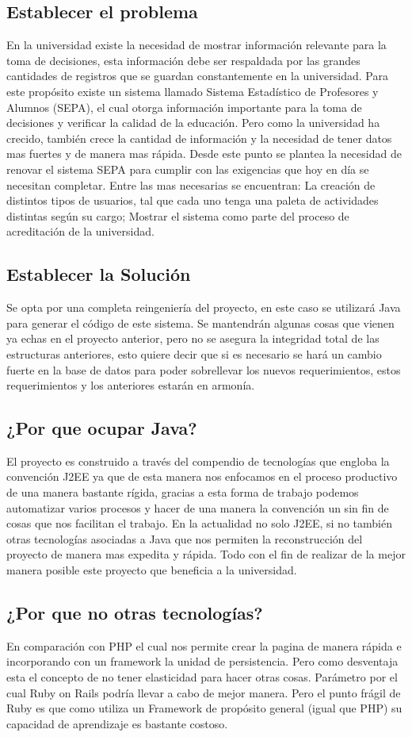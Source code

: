 \documentclass[a4paper,12pt,openany,oneside]{book}
\begin{document}
\subsection{Establecer el problema}
En la universidad existe la necesidad de mostrar información relevante para la toma de decisiones, esta información debe ser respaldada por las grandes cantidades de registros que se guardan constantemente en la universidad. Para este propósito existe un sistema llamado Sistema Estadístico de Profesores y Alumnos (SEPA), el cual otorga información importante para la toma de decisiones y verificar la calidad de la educación. Pero como la universidad ha crecido, también crece la cantidad de información y la necesidad de tener datos mas fuertes y de manera mas rápida. Desde este punto se plantea la necesidad de renovar el sistema SEPA para cumplir con las exigencias que hoy en día se necesitan completar. Entre las mas necesarias se encuentran: La creación de distintos tipos de usuarios, tal que cada uno tenga una paleta de actividades distintas según su cargo; Mostrar el sistema como parte del proceso de acreditación de la universidad.
\subsection{Establecer la Solución}
Se opta por una completa reingeniería del proyecto, en este caso se utilizará Java para generar el código de este sistema. Se mantendrán algunas cosas que vienen ya echas en el proyecto anterior, pero no se asegura la integridad total de las estructuras anteriores, esto quiere decir que si es necesario se hará un cambio fuerte en la base de datos para poder sobrellevar los nuevos requerimientos, estos requerimientos y los anteriores estarán en armonía.
\subsection{¿Por que ocupar Java?}
El proyecto es construido a través del compendio de tecnologías que engloba la convención J2EE ya que de esta manera nos enfocamos en el proceso productivo de una manera bastante rígida, gracias a esta forma de trabajo podemos automatizar varios procesos y hacer de una manera la convención un sin fin de cosas que nos facilitan el trabajo. En la actualidad no solo J2EE, si no también otras tecnologías asociadas a Java que nos permiten la reconstrucción del proyecto de manera mas expedita y rápida. Todo con el fin de realizar de la mejor manera posible este proyecto que beneficia a la universidad.
\subsection{¿Por que no otras tecnologías?}
En comparación con PHP el cual nos permite crear la pagina de manera rápida e incorporando con un framework la unidad de persistencia. Pero como desventaja esta el concepto de no tener elasticidad para hacer otras cosas. Parámetro por el cual Ruby on Rails podría llevar a cabo de mejor manera. Pero el punto frágil de Ruby es que como utiliza un Framework de propósito general (igual que PHP) su capacidad de aprendizaje es bastante costoso. 
\end{document}

